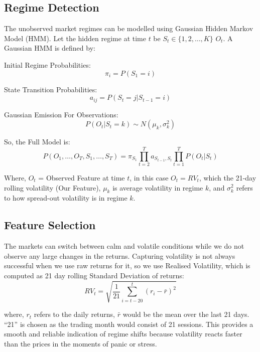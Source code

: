 \documentclass[conference]{IEEEtran}
\begin{document}
\subsection{Regime Detection}

The unobserved market regimes can be modelled using Gaussian Hidden Markov Model (HMM). Let the hidden regime at time $t$ be $S_t \in\{1,2,\ldots,K\}$ $O_t$. A Gaussian HMM is defined by:

Initial Regime Probabilities:
\begin{equation}
\pi_i = P(S_1 = i)
\end{equation}

State Transition Probabilities:
\begin{equation}
a_{ij} = P(S_t = j | S_{t-1} = i)
\end{equation}

Gaussian Emission For Observations:
\begin{equation}
P(O_t|S_t=k) \sim N(\mu_k, \sigma_k^2)
\end{equation}

So, the Full Model is:
\begin{equation}
P(O_1, \ldots, O_T, S_1, \ldots, S_T) = \pi_{S_1} \prod_{t=2}^{T} a_{S_{t-1}, S_t} \prod_{t=1}^{T} P(O_t | S_t)
\end{equation}

Where, $O_t$ = Observed Feature at time $t$, in this case $O_t = RV_t$, which the 21-day rolling volatility (Our Feature), $\mu_k$ is average volatility in regime $k$, and $\sigma_k^2$ refers to how spread-out volatility is in regime $k$.

\subsection{Feature Selection}

The markets can switch between calm and volatile conditions while we do not observe any large changes in the returns. Capturing volatility is not always successful when we use raw returns for it, so we use Realised Volatility, which is computed as 21 day rolling Standard Deviation of returns:
\begin{equation}
RV_t = \sqrt{\frac{1}{21} \sum_{i=t-20}^{t} (r_i - \bar{r})^2}
\end{equation}

where, $r_t$ refers to the daily returns, $\bar{r}$ would be the mean over the last 21 days. ``21'' is chosen as the trading month would consist of 21 sessions. This provides a smooth and reliable indication of regime shifts because volatility reacts faster than the prices in the moments of panic or stress.
\end{document}
